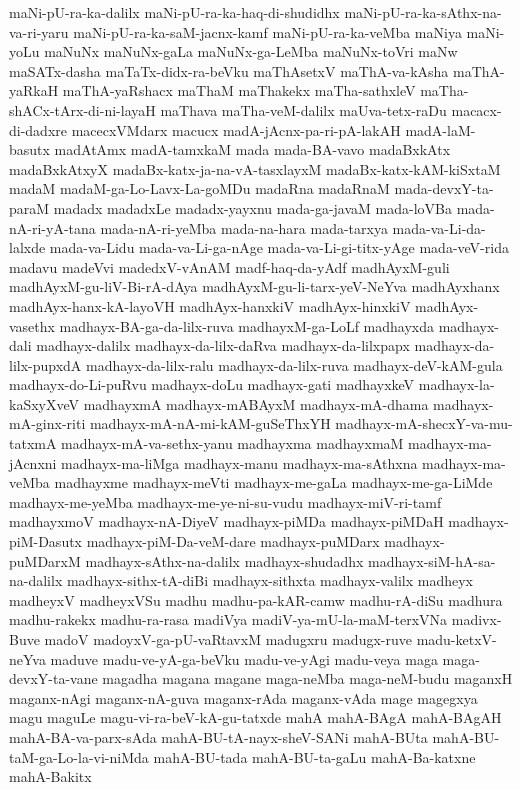{maNi-pU-ra-ka-dalilx
maNi-pU-ra-ka-haq-di-shudidhx
maNi-pU-ra-ka-sAthx-na-va-ri-yaru
maNi-pU-ra-ka-saM-jacnx-kamf
maNi-pU-ra-ka-veMba
maNiya
maNi-yoLu
maNuNx
maNuNx-gaLa
maNuNx-ga-LeMba
maNuNx-toVri
maNw
maSATx-dasha
maTaTx-didx-ra-beVku
maThAsetxV
maThA-va-kAsha
maThA-yaRkaH
maThA-yaRshacx
maThaM
maThakekx
maTha-sathxleV
maTha-shACx-tArx-di-ni-layaH
maThava
maTha-veM-dalilx
maUva-tetx-raDu
macacx-di-dadxre
macecxVMdarx
macucx
madA-jAcnx-pa-ri-pA-lakAH
madA-laM-basutx
madAtAmx
madA-tamxkaM
mada
mada-BA-vavo
madaBxkAtx
madaBxkAtxyX
madaBx-katx-ja-na-vA-tasxlayxM
madaBx-katx-kAM-kiSxtaM
madaM
madaM-ga-Lo-Lavx-La-goMDu
madaRna
madaRnaM
mada-devxY-ta-paraM
madadx
madadxLe
madadx-yayxnu
mada-ga-javaM
mada-loVBa
mada-nA-ri-yA-tana
mada-nA-ri-yeMba
mada-na-hara
mada-tarxya
mada-va-Li-da-lalxde
mada-va-Lidu
mada-va-Li-ga-nAge
mada-va-Li-gi-titx-yAge
mada-veV-rida
madavu
madeVvi
madedxV-vAnAM
madf-haq-da-yAdf
madhAyxM-guli
madhAyxM-gu-liV-Bi-rA-dAya
madhAyxM-gu-li-tarx-yeV-NeYva
madhAyxhanx
madhAyx-hanx-kA-layoVH
madhAyx-hanxkiV
madhAyx-hinxkiV
madhAyx-vasethx
madhayx-BA-ga-da-lilx-ruva
madhayxM-ga-LoLf
madhayxda
madhayx-dali
madhayx-dalilx
madhayx-da-lilx-daRva
madhayx-da-lilxpapx
madhayx-da-lilx-pupxdA
madhayx-da-lilx-ralu
madhayx-da-lilx-ruva
madhayx-deV-kAM-gula
madhayx-do-Li-puRvu
madhayx-doLu
madhayx-gati
madhayxkeV
madhayx-la-kaSxyXveV
madhayxmA
madhayx-mABAyxM
madhayx-mA-dhama
madhayx-mA-ginx-riti
madhayx-mA-nA-mi-kAM-guSeThxYH
madhayx-mA-shecxY-va-mu-tatxmA
madhayx-mA-va-sethx-yanu
madhayxma
madhayxmaM
madhayx-ma-jAcnxni
madhayx-ma-liMga
madhayx-manu
madhayx-ma-sAthxna
madhayx-ma-veMba
madhayxme
madhayx-meVti
madhayx-me-gaLa
madhayx-me-ga-LiMde
madhayx-me-yeMba
madhayx-me-ye-ni-su-vudu
madhayx-miV-ri-tamf
madhayxmoV
madhayx-nA-DiyeV
madhayx-piMDa
madhayx-piMDaH
madhayx-piM-Dasutx
madhayx-piM-Da-veM-dare
madhayx-puMDarx
madhayx-puMDarxM
madhayx-sAthx-na-dalilx
madhayx-shudadhx
madhayx-siM-hA-sa-na-dalilx
madhayx-sithx-tA-diBi
madhayx-sithxta
madhayx-valilx
madheyx
madheyxV
madheyxVSu
madhu
madhu-pa-kAR-camw
madhu-rA-diSu
madhura
madhu-rakekx
madhu-ra-rasa
madiVya
madiV-ya-mU-la-maM-terxVNa
madivx-Buve
madoV
madoyxV-ga-pU-vaRtavxM
madugxru
madugx-ruve
madu-ketxV-neYva
maduve
madu-ve-yA-ga-beVku
madu-ve-yAgi
madu-veya
maga
maga-devxY-ta-vane
magadha
magana
magane
maga-neMba
maga-neM-budu
maganxH
maganx-nAgi
maganx-nA-guva
maganx-rAda
maganx-vAda
mage
magegxya
magu
maguLe
magu-vi-ra-beV-kA-gu-tatxde
mahA
mahA-BAgA
mahA-BAgAH
mahA-BA-va-parx-sAda
mahA-BU-tA-nayx-sheV-SANi
mahA-BUta
mahA-BU-taM-ga-Lo-la-vi-niMda
mahA-BU-tada
mahA-BU-ta-gaLu
mahA-Ba-katxne
mahA-Bakitx
}
